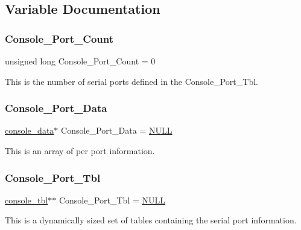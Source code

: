 \subsection{Variable Documentation}
\mbox{\label{legacy-console_8c_a0d8fd810e762900a25000b9acf34df35}} 
\subsubsection{\texorpdfstring{Console\_Port\_Count}{Console\_Port\_Count}}
{\footnotesize\ttfamily unsigned long Console\+\_\+\+Port\+\_\+\+Count = 0}

This is the number of serial ports defined in the Console\+\_\+\+Port\+\_\+\+Tbl. \mbox{\label{legacy-console_8c_a83dec721bc848c432ca3fd874ff7f6d5}} 
\subsubsection{\texorpdfstring{Console\_Port\_Data}{Console\_Port\_Data}}
{\footnotesize\ttfamily \mbox{\hyperlink{serial_8h_ae808572b81efa0deaf4057a9c3e0b5eb}{console\+\_\+data}}$\ast$ Console\+\_\+\+Port\+\_\+\+Data = \mbox{\hyperlink{bestcomm__api_8h_a872bb74de61c3689ccd5b41873fce42c}{N\+U\+LL}}}

This is an array of per port information. \mbox{\label{legacy-console_8c_a47c39eaf13b8d9c87acba10c2d7fb688}} 
\subsubsection{\texorpdfstring{Console\_Port\_Tbl}{Console\_Port\_Tbl}}
{\footnotesize\ttfamily \mbox{\hyperlink{struct__console__tbl}{console\+\_\+tbl}}$\ast$$\ast$ Console\+\_\+\+Port\+\_\+\+Tbl = \mbox{\hyperlink{bestcomm__api_8h_a872bb74de61c3689ccd5b41873fce42c}{N\+U\+LL}}}

This is a dynamically sized set of tables containing the serial port information. 